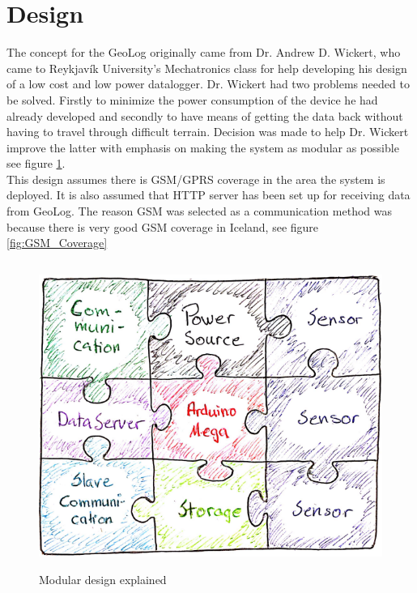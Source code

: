 \section{Design}
The concept for the GeoLog originally came from Dr. Andrew D. Wickert, who came to Reykjavík University's Mechatronics class for 
help developing his design of a low cost and low power datalogger\cite{ALog-BottleLogger}. 
Dr. Wickert had two problems needed to be solved. Firstly to minimize the power consumption of the device he had already developed and secondly to have means of getting the data
back without having to travel through difficult terrain. Decision was made to help Dr. Wickert 
improve the latter with emphasis on making the system as modular as possible see figure \ref{fig:Puzzle}. \\
This design assumes 
there is GSM/GPRS coverage in the area the system is deployed. It is also assumed that HTTP server has been set up for receiving data from GeoLog. The reason GSM was selected as a communication method
was because there is very good GSM coverage in Iceland, see figure \ref{fig:GSM_Coverage} 
\begin{figure}
        \centering
        \includegraphics[height=10cm]{graphics/Puzzle}
        \caption{Modular design explained}
        \label{fig:Puzzle}
\end{figure}
